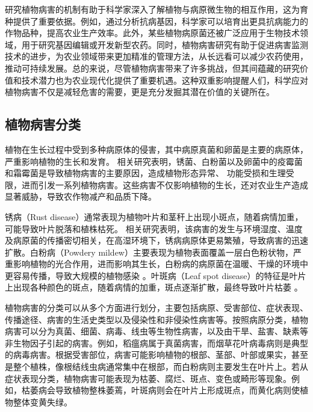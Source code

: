 \documentclass[AutoFakeBold]{LZUThesis-PgD&PhD}
\begin{document}
	
	研究植物病害的机制有助于科学家深入了解植物与病原微生物的相互作用，这为育种提供了重要依据。例如，通过分析抗病基因，科学家可以培育出更具抗病能力的作物品种，提高农业生产效率。此外，某些植物病原菌还被广泛应用于生物技术领域，用于研究基因编辑或开发新型农药。同时，植物病害研究有助于促进病害监测技术的进步，为农业领域带来更加精准的管理方法，从长远看可以减少农药使用，推动可持续发展。总的来说，尽管植物病害带来了许多挑战，但其间蕴藏的研究价值和技术潜力也为农业现代化提供了重要机遇。这种双重影响提醒人们，科学应对植物病害不仅是减轻危害的需要，更是充分发掘其潜在价值的关键所在。
	
	
	
	\subsection{植物病害分类}
	
	植物在生长过程中受到多种病原体的侵害，其中病原真菌和卵菌是主要的病原体，严重影响植物的生长和发育。
	相关研究表明，锈菌、白粉菌以及卵菌中的疫霉菌和霜霉菌是导致植物病害的主要原因，造成植物形态异常、
	功能受损和生理受限，进而引发一系列植物病害\cite{mendgen2002plant,glawe2008powdery,kamoun2015top, thines2016diversity}。这些病害不仅影响植物的生长，还对农业生产造成显著威胁，导致农作物减产和品质下降\cite{gisi2002mechanisms, erwin1996phytophthora}。
	
	锈病（Rust disease）通常表现为植物叶片和茎秆上出现小斑点，随着病情加重，可能导致叶片脱落和植株枯死。
	相关研究表明，该病害的发生与环境湿度、温度及病原菌的传播密切相关，在高湿环境下，锈病病原体更易繁殖，导致病害的迅速扩散\cite{mendgen2002plant, huber1992modeling}。白粉病（Powdery  mildew）主要表现为植物表面覆盖一层白色粉状物，严重影响植物的光合作用，进而影响其生长，白粉病的病原菌在温暖、干燥的环境中更容易传播，导致大规模的植物感染 \cite{glawe2008powdery, yarwood1957powdery}。叶斑病（Leaf spot disease）的特征是叶片上出现各种颜色的斑点，随着病情的加重，斑点逐渐扩散，最终导致叶片枯萎 \cite{agrios2005plant, thomma2003alternaria}。
	
	植物病害的分类可以从多个方面进行划分，主要包括病原、受害部位、症状表现、传播途径、病害的生活史类型以及侵染性和非侵染性病害等。按照病原分类，植物病害可以分为真菌、细菌、病毒、线虫等生物性病害，以及由干旱、盐害、缺素等非生物因子引起的病害。例如，稻瘟病属于真菌病害，而烟草花叶病毒病则是典型的病毒病害\cite{goldbach2001tobacco, desselberger2015viruses}。根据受害部位，病害可能影响植物的根部、茎部、叶部或果实，甚至是整个植株，像根结线虫病通常集中在根部，而白粉病则主要发生在叶片上\cite{glawe2008powdery}。若从症状表现分类，植物病害可能表现为枯萎、腐烂、斑点、变色或畸形等现象。例如，枯萎病会导致植物整株萎蔫，叶斑病则会在叶片上形成斑点，而黄化病则使植物整体变黄失绿\cite{watson2009comparing}。
\end{document}
